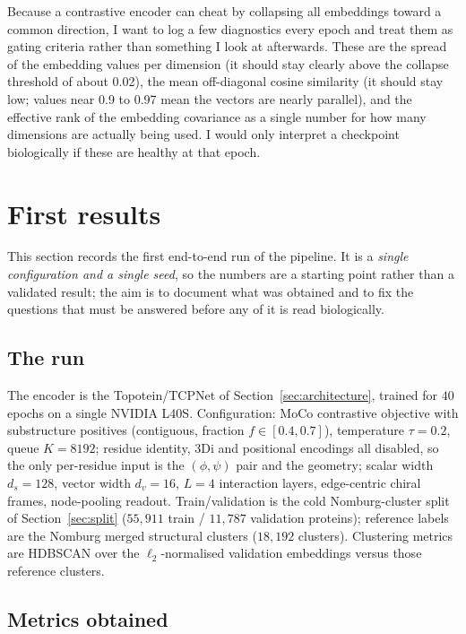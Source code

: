 \documentclass[11pt,a4paper]{article}
\theoremstyle{definition}
\begin{document}
Because a contrastive encoder can cheat by collapsing all embeddings toward a
common direction, I want to log a few diagnostics every epoch and treat them as
gating criteria rather than something I look at afterwards. These are the spread
of the embedding values per dimension (it should stay clearly above the collapse
threshold of about 0.02), the mean off-diagonal cosine similarity (it should stay
low; values near 0.9 to 0.97 mean the vectors are nearly parallel), and the
effective rank of the embedding covariance as a single number for how many
dimensions are actually being used. I would only interpret a checkpoint
biologically if these are healthy at that epoch.



\section{First results}
\label{sec:results}

This section records the first end-to-end run of the pipeline. It is a
\emph{single configuration and a single seed}, so the numbers are a starting
point rather than a validated result; the aim is to document what was obtained and
to fix the questions that must be answered before any of it is read biologically.

\subsection{The run}

The encoder is the Topotein/TCPNet of Section~\ref{sec:architecture}, trained for
$40$ epochs on a single NVIDIA L40S. Configuration: MoCo contrastive objective with
substructure positives (contiguous, fraction $f\in[0.4,0.7]$), temperature
$\tau=0.2$, queue $K=8192$; residue identity, 3Di and positional encodings all
disabled, so the only per-residue input is the $(\phi,\psi)$ pair and the geometry;
scalar width $d_s=128$, vector width $d_v=16$, $L=4$ interaction layers,
edge-centric chiral frames, node-pooling readout. Train/validation is the cold
Nomburg-cluster split of Section~\ref{sec:split} ($55{,}911$ train / $11{,}787$
validation proteins); reference labels are the Nomburg merged structural clusters
($18{,}192$ clusters). Clustering metrics are HDBSCAN over the $\ell_2$-normalised
validation embeddings versus those reference clusters.

\subsection{Metrics obtained}
\end{document}

